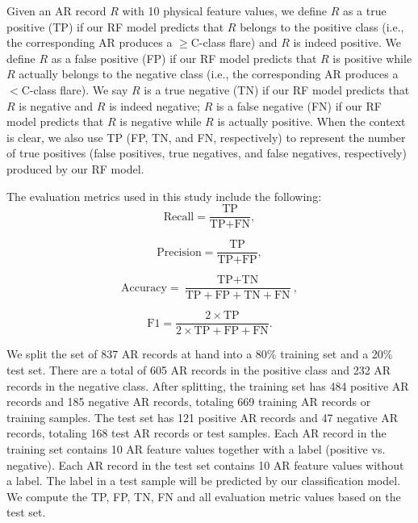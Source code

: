 \documentclass[draft]{agujournal2019}
\begin{document}
Given an AR record $R$ with 10 physical feature values,
we define $R$ as a true positive (TP) 
if our RF model predicts that $R$ belongs to the positive class
(i.e., the corresponding AR produces a $\geq$C-class flare)
and $R$ is indeed positive.
We define $R$ as a false positive (FP)
if our RF model predicts that $R$ is positive
while $R$ actually belongs to the negative class
(i.e., the corresponding AR produces a $<$C-class flare). 
We say $R$ is a true negative (TN) if our RF model
predicts that $R$ is negative
and $R$ is indeed negative; 
$R$ is a false negative (FN) if
our RF model predicts that $R$ is
negative while $R$ is actually positive.
When the context is clear, we also use
TP (FP, TN, and FN, respectively) 
to represent the number of
true positives
(false positives, true negatives, and false negatives, respectively) 
produced by our RF model.

The evaluation metrics used in this study include the
following:
\begin{equation}
    \text{Recall} = \frac{\mbox{TP}}{\mbox{TP} + \mbox{FN}},
\end{equation}

\begin{equation}
    \text{Precision} = \frac{\mbox{TP}}{\mbox{TP} + \mbox{FP}},
\end{equation}

\begin{equation}
    \text{Accuracy} = \frac{\mbox{TP} + \mbox{TN}}
    {\mbox{TP} + \mbox{FP} + \mbox{TN} + \mbox{FN}},
\end{equation}

\begin{equation}
\text{F1} =  \frac{2 \times \text{TP}}{2 \times \text{TP} + \text{FP}+\text{FN}}.
\end{equation}

We split the set of 837 AR records at hand into a
80\% training set and a 20\% test set.
There are a total of 605 AR records
in the positive class and
232 AR records in the negative class.
After splitting, the training set has 484 positive AR records and 185 negative AR records, totaling 669 training AR records or training samples.
The test set has 121 positive AR records
and 47 negative AR records, totaling 168 test AR records or test samples.
Each AR record in the training set contains 10 AR feature values together with a label
(positive vs. negative).
Each AR record in the test set contains 10 AR feature values without a label.
The label in a test sample will be predicted by our classification model.
We compute the TP, FP, TN, FN and all evaluation metric values based on the test set.
\end{document}
